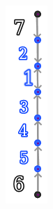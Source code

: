 \documentclass[12pt, a4paper, twocolumn]{article}
\newcommand{\githubPics}{https://raw.githubusercontent.com/artamono1/druhg/master/papers/druhg/}
\begin{document}
\begin{figure}[!htb]
  \begin{minipage}[c]{0.20\linewidth}
    \href{\githubPics pdn_line.png}{\includegraphics[width=0.4\linewidth]{pdn_line.png}}
  \end{minipage}\hfill
  \begin{minipage}[c]{0.40\linewidth}

\end{minipage}
\end{figure}
\end{document}
